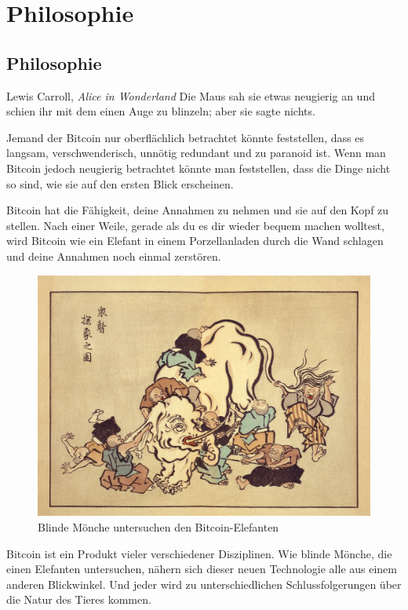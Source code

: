 \part{Philosophie}
\label{ch:philosophy}
\chapter*{Philosophie}

\begin{chapquote}{Lewis Carroll, \textit{Alice in Wonderland}}
Die Maus sah sie etwas neugierig an und schien ihr mit dem einen Auge zu
blinzeln; aber sie sagte nichts.
\end{chapquote}

Jemand der Bitcoin nur oberflächlich betrachtet könnte feststellen, dass es
langsam, verschwenderisch, unnötig redundant und zu paranoid ist. Wenn man
Bitcoin jedoch neugierig betrachtet könnte man feststellen, dass die Dinge nicht
so sind, wie sie auf den ersten Blick erscheinen.

Bitcoin hat die Fähigkeit, deine Annahmen zu nehmen und sie auf den Kopf zu
stellen. Nach einer Weile, gerade als du es dir wieder bequem machen wolltest,
wird Bitcoin wie ein Elefant in einem Porzellanladen durch die Wand schlagen und
deine Annahmen noch einmal zerstören.

\begin{figure}
  \includegraphics{assets/images/blind-monks.jpg}
  \caption{Blinde Mönche untersuchen den Bitcoin-Elefanten}
  \label{fig:blind-monks}
\end{figure}

Bitcoin ist ein Produkt vieler verschiedener Disziplinen. Wie blinde Mönche, die
einen Elefanten untersuchen, nähern sich dieser neuen Technologie alle aus einem
anderen Blickwinkel. Und jeder wird zu unterschiedlichen Schlussfolgerungen über
die Natur des Tieres kommen.

